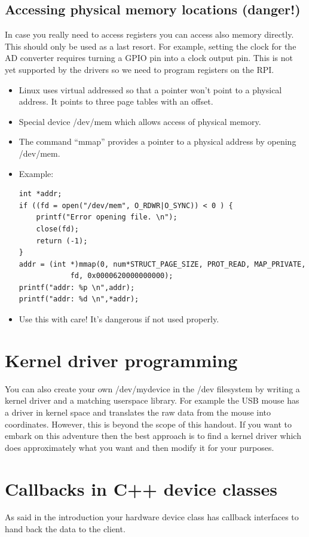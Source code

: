 \documentclass[12pt]{report}
\begin{document}
\subsection{Accessing physical memory locations (danger!)}
In case you really need to access registers you can access
also memory directly. This should only be used as a last resort.
For example, setting the clock for the AD converter requires
turning a GPIO pin into a clock output pin. This is not yet
supported by the drivers so we need to program registers
on the RPI.
\begin{itemize}
\item Linux uses virtual addressed so that a pointer won't
point to a physical address. It points to three page
tables with an offset.
\item Special device /dev/mem which allows access of physical
memory.
\item The command ``mmap'' provides a pointer to a physical
address by opening /dev/mem.
\item Example:
\begin{verbatim}
int *addr;
if ((fd = open("/dev/mem", O_RDWR|O_SYNC)) < 0 ) {
    printf("Error opening file. \n");
    close(fd);
    return (-1);
}
addr = (int *)mmap(0, num*STRUCT_PAGE_SIZE, PROT_READ, MAP_PRIVATE,
            fd, 0x0000620000000000);
printf("addr: %p \n",addr);
printf("addr: %d \n",*addr);
\end{verbatim}
\item Use this with care! It's dangerous if not used properly.
\end{itemize}


\section{Kernel driver programming}
You can also create your own /dev/mydevice in the /dev filesystem
by writing a kernel driver and a matching userspace library. For
example the USB mouse has a driver in kernel space and translates
the raw data from the mouse into coordinates. However,
this is beyond the scope of this handout. If you want to embark
on this adventure then the best approach is to
find a kernel driver which does approximately what you want and then
modify it for your purposes.


\section{Callbacks in C++ device classes}
As said in the introduction your hardware device class has callback interfaces
to hand back the data to the client.
\end{document}

